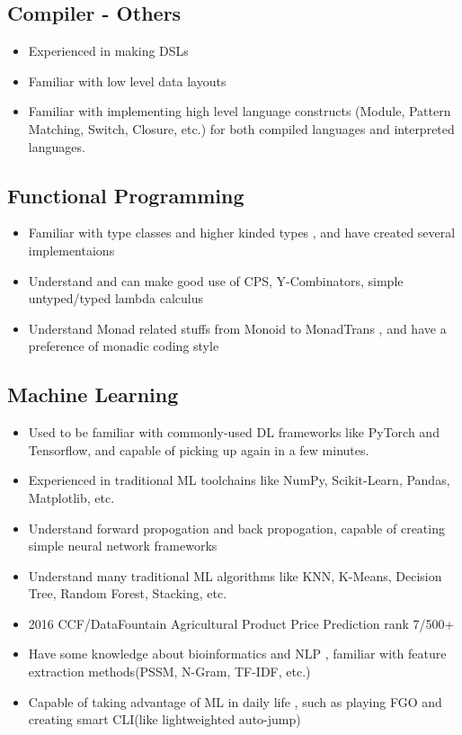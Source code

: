 \documentclass{resume}
\begin{document}
\subsection{\textbf{Compiler - Others}}
\begin{itemize}
  \item Experienced in making DSLs
  \item Familiar with low level data layouts
  \item Familiar with implementing high level language constructs
        (Module, Pattern Matching, Switch, Closure, etc.) for both
        compiled languages and interpreted languages.
\end{itemize}

\subsection{\textbf{Functional Programming}}
\begin{itemize}
  \item Familiar with type classes and higher kinded types
        , and have created several implementaions
  \item Understand and can make good use of CPS, Y-Combinators, simple untyped/typed lambda calculus
  \item Understand Monad related stuffs from Monoid to MonadTrans
        , and have a preference of monadic coding style
\end{itemize}

\subsection{\textbf{Machine Learning}}
\begin{itemize}
  \item Used to be familiar with commonly-used DL frameworks like PyTorch and Tensorflow, and capable of picking up again in a few minutes.
  \item Experienced in traditional ML toolchains like NumPy, Scikit-Learn, Pandas, Matplotlib, etc.
  \item Understand forward propogation and back propogation, capable of creating simple neural network frameworks
  \item Understand many traditional ML algorithms like KNN, K-Means, Decision Tree, Random Forest, Stacking, etc.
  \item 2016 CCF/DataFountain Agricultural Product Price Prediction rank 7/500+
  \item Have some knowledge about bioinformatics and NLP
        , familiar with feature extraction methods(PSSM, N-Gram, TF-IDF, etc.)
  \item Capable of taking advantage of ML in daily life
        , such as playing FGO and creating smart CLI(like lightweighted auto-jump)
\end{itemize}
\end{document}
